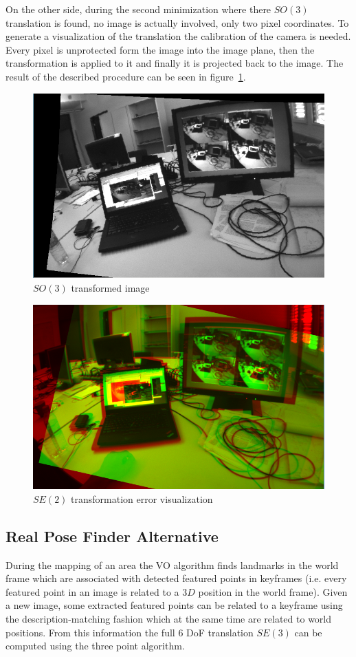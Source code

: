 On the other side, during the second minimization where there $SO(3)$ translation is found, no image is actually involved, only two pixel coordinates. To generate a visualization of the translation the calibration of the camera is needed. Every pixel is unprotected form the image into the image plane, then the transformation is applied to it and finally it is projected back to the image. The result of the described procedure can be seen in figure~\ref{fig:so3_transformation_1}.\\

\begin{figure}[htpb]
  \centering
  \includegraphics[width=0.6\linewidth]{img/so3_transformation_1.png}
  \caption{$SO(3)$ transformed image}
  \label{fig:so3_transformation_1}
\end{figure}

\begin{figure}[htpb]
  \centering
  \includegraphics[width=0.6\linewidth]{img/se2_error_1.png}
  \caption{$SE(2)$ transformation error visualization}
  \label{fig:se3_error_1}
\end{figure}


\subsection{Real Pose Finder Alternative}
\label{sub:real_pose_finder_alternative}

During the mapping of an area the VO algorithm finds landmarks in the world frame which are associated with detected featured points in keyframes (i.e. every featured point in an image is related to a $3D$ position in the world frame). Given a new image, some extracted featured points can be related to a keyframe using the description-matching fashion which at the same time are related to world positions. From this information the full 6 DoF translation $SE(3)$ can be computed using the three point algorithm.\\

